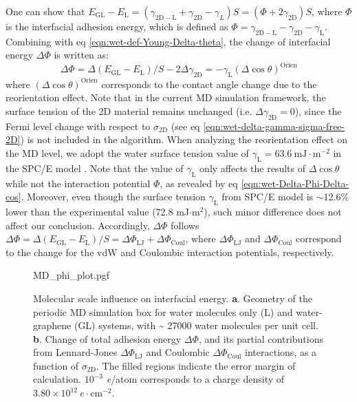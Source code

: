 %
One can show that
\(E_{\mathrm{GL}} - E_{\mathrm{L}} = (\gamma_{\mathrm{2D-L}} +
\gamma_{\mathrm{2D}} - \gamma_{L})S = (\Phi + 2
\gamma_{\mathrm{2D}})S\), where \(\Phi\) is the interfacial adhesion energy,
which is defined as
\(\Phi = \gamma_{\mathrm{2D-L}} - \gamma_{\mathrm{2D}} -
\gamma_{\mathrm{L}}\).
Combining with eq
\autoref{eqn:wet-def-Young-Delta-theta}, the change of interfacial
energy \(\Delta \Phi\) is written as:
\begin{equation}
\label{eqn:wet-Delta-Phi-Delta-cos}
\Delta \Phi = \Delta (E_{\mathrm{GL}} - E_{\mathrm{L}})/S - 2\Delta \gamma_{\mathrm{2D}} = -\gamma_{\mathrm{L}} (\Delta \cos \theta)^{\mathrm{Orien}}
\end{equation}
where \((\Delta\cos \theta)^{\mathrm{Orien}}\) corresponds to the
contact angle change due to the reorientation effect.
%
Note that in the
current MD simulation framework, the surface tension of the 2D material
remains unchanged (i.e. \(\Delta \gamma_{\mathrm{2D}}=0\)), since the
Fermi level change with respect to \(\sigma_{\mathrm{2D}}\) (see eq
\autoref{eqn:wet-delta-gamma-sigma-free-2D}) is not included in the algorithm.
%
When analyzing the reorientation effect on the MD level, we adopt the
water surface tension value of
\(\gamma_{\mathrm{L}}=63.6\ \mathrm{mJ}\cdot \mathrm{m}^{-2}\) in the
SPC/E model \autocite{Vega_2007_tension}.
%
Note that the value of
\(\gamma_{\mathrm{L}}\) only affects the results of
\(\Delta \cos \theta\) while not the interaction potential \(\Phi\), as revealed by eq
\autoref{eqn:wet-Delta-Phi-Delta-cos}.
%
Moreover, even though the surface tension $\gamma_{\mathrm{L}}$ from
SPC/E model is $\sim{}$12.6\% lower than the experimental value (72.8
mJ\(\cdot\)m\(^2\)), such minor difference does not affect our
conclusion.
%
Accordingly, \(\Delta \Phi\) follows
\(\Delta \Phi = \Delta (E_{\mathrm{GL}} - E_{\mathrm{L}})/S = \Delta
\Phi_{\mathrm{LJ}} + \Delta \Phi_{\mathrm{Coul}}\), where
\(\Delta \Phi_{\mathrm{LJ}}\) and \(\Delta \Phi_{\mathrm{Coul}}\)
correspond to the change for the vdW and Coulombic interaction
potentials, respectively.

\begin{figure}[!htbp]
  \centering
  {MD_phi_plot.pgf}
  \caption{\label{fig:wet-MD-res1}%
    Molecular scale influence on interfacial
    energy. \textbf{a}. Geometry of the periodic MD simulation box for
    water molecules only (L) and water-graphene (GL) systems, with
    \textasciitilde{} 27000 water molecules per unit cell.
    \textbf{b}. Change
    of total adhesion energy \(\Delta\Phi\), and its partial
    contributions from Lennard-Jones \(\Delta\Phi_{\mathrm{LJ}}\) and
    Coulombic \(\Delta\Phi_{\mathrm{Coul}}\) interactions, as a
    function of \(\sigma_{\mathrm{2D}}\). The filled regions indicate
    the error margin of calculation. \(10^{-3}\) \textit{e}/atom
    corresponds to a charge density of
    \(3.80 \times 10^{12}\ e \cdot \mathrm{cm}^{-2}\).}
\end{figure}


